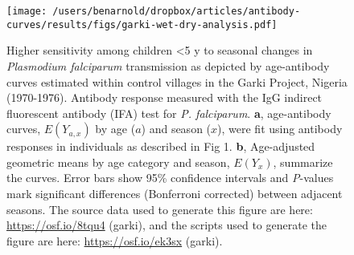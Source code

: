 \documentclass[11pt]{article}
\begin{document}
\begin{figure}[htbp]
\begin{center}
\texttt{[image: /users/benarnold/dropbox/articles/antibody-curves/results/figs/garki-wet-dry-analysis.pdf]}
\begin{minipage}{\textwidth}
\caption{Higher sensitivity among children <5 y to seasonal changes in \textit{Plasmodium falciparum} transmission as depicted by age-antibody curves estimated within control villages in the Garki Project, Nigeria (1970-1976). Antibody response measured with the IgG indirect fluorescent antibody (IFA) test for \textit{P. falciparum}.  \textbf{a}, age-antibody curves, $E(Y_{a,x})$ by age ($a$) and season ($x$), were fit using antibody responses in individuals as described in Fig 1. \textbf{b}, Age-adjusted geometric means by age category and season, $E(Y_x)$, summarize the curves. Error bars show 95\% confidence intervals and \textit{P}-values mark significant differences (Bonferroni corrected) between adjacent seasons.  The source data used to generate this figure are here: \url{https://osf.io/8tqu4} (garki), and the scripts used to generate the figure are here: \url{https://osf.io/ek3sx} (garki). }
\label{fig:garkiwetdry}
\end{minipage}
\end{center}
\end{figure}
\end{document}

